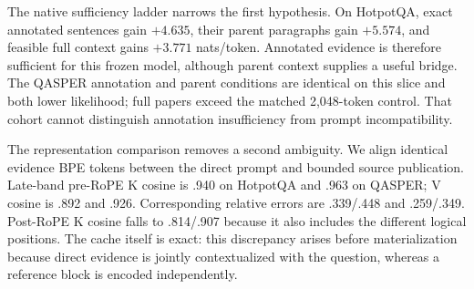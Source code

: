 \documentclass[11pt]{article}
\begin{document}
\begin{table}[htbp]
\centering
\scriptsize
\caption{Oracle-gap audit on the canonical four-example-per-dataset cohort. $E$ is annotated
evidence, $D$ other tokens in selected parents, and $H$ the ordinary local/head support. K/V
similarities average aligned evidence tokens over the last 14 layers. The counterfactual removes
$D$ from the existing logits and renormalizes; it does not change real materialization.}
\label{tab:oracle-gap-audit}
\end{table}

The native sufficiency ladder narrows the first hypothesis. On HotpotQA, exact annotated sentences
gain $+4.635$, their parent paragraphs gain $+5.574$, and feasible full context gains $+3.771$
nats/token. Annotated evidence is therefore sufficient for this frozen model, although parent
context supplies a useful bridge. The QASPER annotation and parent conditions are identical on
this slice and both lower likelihood; full papers exceed the matched 2,048-token control. That
cohort cannot distinguish annotation insufficiency from prompt incompatibility.

The representation comparison removes a second ambiguity. We align identical evidence BPE tokens
between the direct prompt and bounded source publication. Late-band pre-RoPE K cosine is .940 on
HotpotQA and .963 on QASPER; V cosine is .892 and .926. Corresponding relative errors are
.339/.448 and .259/.349. Post-RoPE K cosine falls to .814/.907 because it also includes the
different logical positions. The cache itself is exact: this discrepancy arises before
materialization because direct evidence is jointly contextualized with the question, whereas a
reference block is encoded independently.
\end{document}
